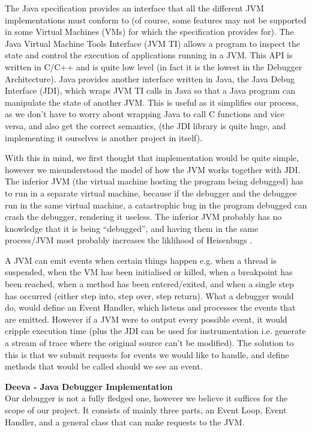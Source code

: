 \documentclass[11pt, a4paper]{article}
\begin{document}
The Java specification provides an interface that all the different JVM implementations must conform to (of course, some features may not be supported in some Virtual Machines (VMs) for which the specification provides for).
The Java Virtual Machine Tools Interface (JVM TI) \cite{jvmti} allows a program to inspect the state and control the execution of applications running in a JVM.
This API is written in C/C++ and is quite low level (in fact it is the lowest in the Debugger Architecture).
Java provides another interface written in Java, the Java Debug Interface (JDI), which wraps JVM TI calls in Java so that a Java program can manipulate the state of another JVM.
This is useful as it simplifies our process, as we don't have to worry about wrapping Java to call C functions and vice versa, and also get the correct semantics, (the JDI library is quite huge, and implementing it ourselves is another project in itself).

With this in mind, we first thought that implementation would be quite simple, however we misunderstood the model of how the JVM works together with JDI.
The inferior JVM (the virtual machine hosting the program being debugged) has to run in a separate virtual machine, because if the debugger and the debuggee run in the same virtual machine, a catastrophic bug in the program debugged can crash the debugger, rendering it useless.
The inferior JVM probably has no knowledge that it is being ``debugged'', and having them in the same process/JVM most probably increases the liklihood of Heisenbugs \cite{heisenbug}.

A JVM can emit events when certain things happen e.g. when a thread is suspended, when the VM has been initialised or killed, when a breakpoint has been reached, when a method has been entered/exited, and when a single step has occurred (either step into, step over, step return).
What a debugger would do, would define an Event Handler, which listens and processes the events that are emitted.
However if a JVM were to output every possible event, it would cripple execution time (plus the JDI can be used for instrumentation i.e. generate a stream of trace where the original source can't be modified).
The solution to this is that we submit requests for events we would like to handle, and define methods that would be called should we see an event.

\textbf{Deeva - Java Debugger Implementation}\\
Our debugger is not a fully fledged one, however we believe it suffices for the scope of our project.
It consists of mainly three parts, an Event Loop, Event Handler, and a general class that can make requests to the JVM.
\end{document}
